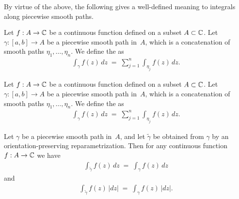 By virtue of the above, the following gives a well-defined meaning
to integrals along piecewise smooth paths.
\begin{definition}
  \label{def:contour_integral}
  Let $f : A \to \mathbb{C}$ be a continuous function defined on a subset $A \subset \mathbb{C}$.
  Let $\gamma \colon [a,b] \to A$ be a piecewise smooth path in~$A$,
  which is a concatenation of smooth paths $\eta_1, \ldots, \eta_n$.
  We define the  as
  \begin{align*}
    \int_\gamma f(z) \, dz \; = \; \sum_{j=1}^n \int_{\eta_j} f(z) \, dz .
  \end{align*}
\end{definition}
\begin{definition}
  \label{def:arc_length_integral}
  Let $f : A \to \mathbb{C}$ be a continuous function defined on a subset $A \subset \mathbb{C}$.
  Let $\gamma \colon [a,b] \to A$ be a piecewise smooth path in~$A$,
  which is a concatenation of smooth paths $\eta_1, \ldots, \eta_n$.
  We define the  as
  \begin{align*}
    \int_\gamma f(z) \, dz \; = \; \sum_{j=1}^n \int_{\eta_j} f(z) \, dz .
  \end{align*}
\end{definition}

\begin{lemma}
  \label{lem:reparametrization_invariance_of_integral}
  Let $\gamma$ be a piecewise smooth path in~$A$,
  and let $\widetilde{\gamma}$ be obtained from $\gamma$ by an
  orientation-preserving reparametrization. Then for any continuous
  function $f : A \to \mathbb{C}$ we have
  \begin{align*}
    \int_{\widetilde{\gamma}} f(z) \, dz \; = \; \int_{\gamma} f(z) \, dz
  \end{align*}
  and
  \begin{align*}
    \int_{\widetilde{\gamma}} f(z) \, |dz| \; = \; \int_{\gamma} f(z) \, |dz| .
  \end{align*}
\end{lemma}

